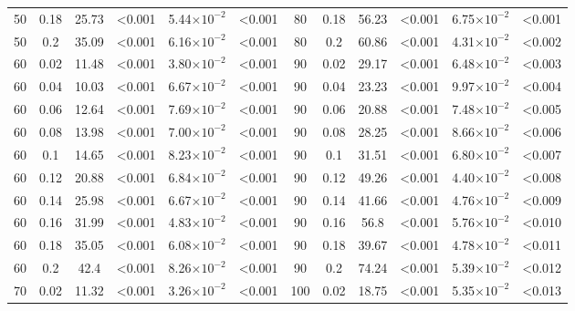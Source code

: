 \documentclass[12pt]{article}
\begin{document}
\begin{spacing}{2.0}
\begin{table}[hb!]
\begin{tabular}{c c | c c| c c ||c c | c c | c c |}
            50  & 0.18  & 25.73 & \textless0.001  & 5.44$\times10^{-2}$ & \textless0.001  & 80  & 0.18  & 56.23 & \textless0.001  & 6.75$\times10^{-2}$ & \textless0.001  \\
            50  & 0.2 & 35.09 & \textless0.001  & 6.16$\times10^{-2}$ & \textless0.001  & 80  & 0.2 & 60.86 & \textless0.001  & 4.31$\times10^{-2}$ & \textless0.002  \\
            60  & 0.02  & 11.48 & \textless0.001  & 3.80$\times10^{-2}$ & \textless0.001  & 90  & 0.02  & 29.17 & \textless0.001  & 6.48$\times10^{-2}$ & \textless0.003  \\
            60  & 0.04  & 10.03 & \textless0.001  & 6.67$\times10^{-2}$ & \textless0.001  & 90  & 0.04  & 23.23 & \textless0.001  & 9.97$\times10^{-2}$ & \textless0.004  \\
            60  & 0.06  & 12.64 & \textless0.001  & 7.69$\times10^{-2}$ & \textless0.001  & 90  & 0.06  & 20.88 & \textless0.001  & 7.48$\times10^{-2}$ & \textless0.005  \\
            60  & 0.08  & 13.98 & \textless0.001  & 7.00$\times10^{-2}$ & \textless0.001  & 90  & 0.08  & 28.25 & \textless0.001  & 8.66$\times10^{-2}$ & \textless0.006  \\
            60  & 0.1 & 14.65 & \textless0.001  & 8.23$\times10^{-2}$ & \textless0.001  & 90  & 0.1 & 31.51 & \textless0.001  & 6.80$\times10^{-2}$ & \textless0.007  \\
            60  & 0.12  & 20.88 & \textless0.001  & 6.84$\times10^{-2}$ & \textless0.001  & 90  & 0.12  & 49.26 & \textless0.001  & 4.40$\times10^{-2}$ & \textless0.008  \\
            60  & 0.14  & 25.98 & \textless0.001  & 6.67$\times10^{-2}$ & \textless0.001  & 90  & 0.14  & 41.66 & \textless0.001  & 4.76$\times10^{-2}$ & \textless0.009  \\
            60  & 0.16  & 31.99 & \textless0.001  & 4.83$\times10^{-2}$ & \textless0.001  & 90  & 0.16  & 56.8  & \textless0.001  & 5.76$\times10^{-2}$ & \textless0.010  \\
            60  & 0.18  & 35.05 & \textless0.001  & 6.08$\times10^{-2}$ & \textless0.001  & 90  & 0.18  & 39.67 & \textless0.001  & 4.78$\times10^{-2}$ & \textless0.011  \\
            60  & 0.2 & 42.4  & \textless0.001  & 8.26$\times10^{-2}$ & \textless0.001  & 90  & 0.2 & 74.24 & \textless0.001  & 5.39$\times10^{-2}$ & \textless0.012  \\
            70  & 0.02  & 11.32 & \textless0.001  & 3.26$\times10^{-2}$ & \textless0.001  & 100 & 0.02  & 18.75 & \textless0.001  & 5.35$\times10^{-2}$ & \textless0.013  \\

\end{tabular}
\end{table}
\end{spacing}
\end{document}
